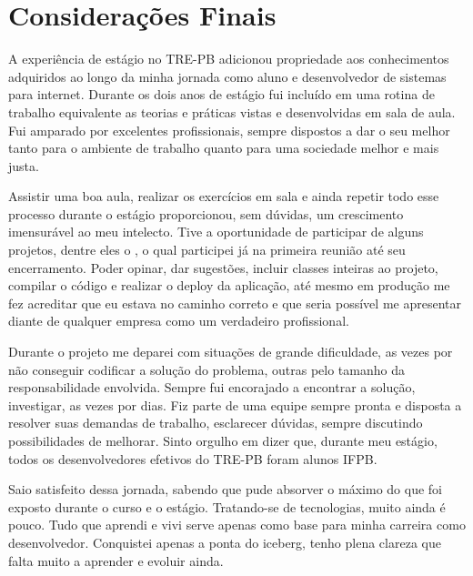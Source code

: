 
\chapter{Considerações Finais}
\label{chap:consideracoesFinais}


A experiência de estágio no TRE-PB adicionou propriedade aos conhecimentos adquiridos ao longo da minha jornada como aluno e desenvolvedor de sistemas para internet. 
Durante os dois anos de estágio fui incluído em uma rotina de trabalho equivalente as teorias e práticas vistas e desenvolvidas em sala de aula. 
Fui amparado por excelentes profissionais, sempre dispostos a dar o seu melhor tanto para o ambiente de trabalho quanto para uma sociedade melhor e mais justa.

Assistir uma boa aula, realizar os exercícios em sala e ainda repetir todo esse processo durante o estágio proporcionou, sem dúvidas, um crescimento imensurável ao meu intelecto. Tive a oportunidade de participar de alguns projetos, dentre eles o \imprimirtitulo \space, o qual participei já na primeira reunião até seu encerramento. Poder opinar, dar sugestões, incluir classes inteiras ao projeto, compilar o código e realizar o deploy da aplicação, até mesmo em produção me fez acreditar que eu estava no caminho correto e que seria possível me apresentar diante de qualquer empresa como um verdadeiro profissional.

Durante o projeto me deparei com situações de grande dificuldade, as vezes por não conseguir codificar a solução do problema, outras pelo tamanho da responsabilidade envolvida. Sempre fui encorajado a encontrar a solução, investigar, as vezes por dias.
Fiz parte de uma equipe sempre pronta e disposta a resolver suas demandas de trabalho, esclarecer dúvidas, sempre discutindo possibilidades de melhorar. Sinto orgulho em dizer que, durante meu estágio, todos os desenvolvedores efetivos do TRE-PB foram alunos IFPB.

Saio satisfeito dessa jornada, sabendo que pude absorver o máximo do que foi exposto durante o curso e o estágio. Tratando-se de tecnologias, muito ainda é pouco. Tudo que aprendi e vivi serve apenas como base para minha carreira como desenvolvedor. Conquistei apenas a ponta do iceberg, tenho plena clareza que falta muito a aprender e evoluir ainda. 
